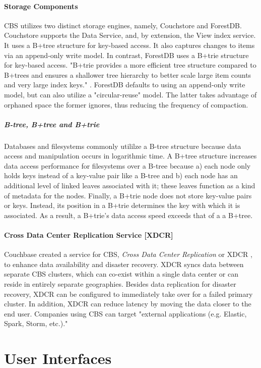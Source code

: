 \documentclass[9pt,twocolumn,twoside]{styles/osajnl}
\begin{document}
\paragraph{Storage Components} CBS utilizes two distinct storage engines, namely, Couchstore and ForestDB.  Couchstore supports the Data Service, and, by extension, the View index service.  It uses a B+tree structure for key-based access.  It also captures changes to items via an append-only write model. In contrast, ForestDB uses a B+trie structure for key-based access.  "B+trie provides a more efficient tree structure compared to B+trees and ensures a shallower tree hierarchy to better scale large item counts and very large index keys." \cite {www-bplustrie-cbsinc}.  ForestDB defaults to using an append-only write model, but can also utilize a "circular-reuse" model.  The latter takes advantage of orphaned space the former ignores, thus reducing the frequency of compaction.
\subparagraph{B-tree, B+tree and B+trie}
Databases and filesystems commonly utililze a B-tree structure because data access and manipulation occurs in logarithmic time.  A B+tree structure increases data access performance for filesystems over a B-tree because a) each node only holds keys instead of a key-value pair like a B-tree and b) each node has an additional level of linked leaves associated with it; these leaves function as a kind of metadata for the nodes.  Finally, a B+trie node does not store key-value pairs or keys.  Instead, its position in a B+trie determines the key with which it is associated.  As a result, a B+trie's data access speed exceeds that of a a B+tree.  

\paragraph{Cross Data Center Replication Service [XDCR]}
Couchbase created a service for CBS, \textit{Cross Data Center Replication} or XDCR \cite{www-xdcr-cbsinc}, to enhance data availability and disaster recovery.  XDCR syncs data between separate CBS clusters, which can co-exist within a single data center or can reside in entirely separate geographies.  Besides data replication for disaster recovery, XDCR can be configured to immediately take over for a failed primary cluster.  In addition, XDCR can reduce latency by moving the data closer to the end user.  Companies using CBS can target "external applications (e.g. Elastic, Spark, Storm, etc.)."

\section{User Interfaces}
\end{document}
